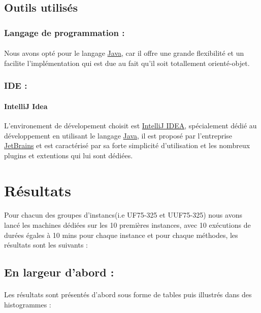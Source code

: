 \subsection{Outils utilisés}
\subsubsection{Langage de programmation : }
\paragraph{}
Nous avons opté pour le langage \href{https://fr.wikipedia.org/wiki/Java_(technique)}{Java}, car il offre une grande flexibilité et un facilite l'implémentation qui est due au fait qu'il soit totallement orienté-objet.
\subsubsection{IDE : }
\paragraph{IntelliJ Idea} L'environement de dévelopement choisit est \href{https://www.jetbrains.com/idea/}{IntelliJ IDEA}, spécialement dédié au développement en utilisant le langage \href{https://fr.wikipedia.org/wiki/Java_(technique)}{Java}, il est proposé par l'entreprise \href{https://www.jetbrains.com}{JetBrains} et est caractérisé par sa forte simplicité d'utilisation et les nombreux plugins et extentions qui lui sont dédiées.

\section{Résultats}\label{tests}
\paragraph{}
Pour chacun des groupes d'instancs(i.e UF75-325 et UUF75-325) nous avons lancé les machines dédiées sur les 10 premières instances, avec 10 exécutions de durées égales à 10 mins pour chaque instance et pour chaque méthodes, les résultats sont les suivants : \\
\subsection{En largeur d'abord :}
\paragraph{}
Les résultats sont présentés d'abord sous forme de tables puis illustrés dans des histogrammes :
